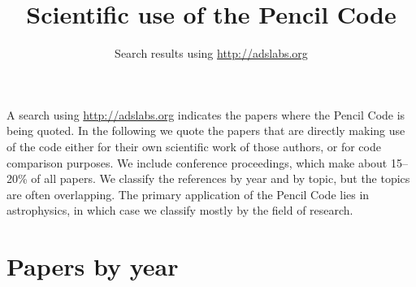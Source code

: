 \documentclass[12pt]{article}
\begin{document}
\title{Scientific use of the {\sc Pencil Code}}
\author{Search results using \url{http://adslabs.org}}
\maketitle

A search using \url{http://adslabs.org} indicates the papers where the
{\sc Pencil Code} is being quoted.
In the following we quote the papers that are directly making use of
the code either for their own scientific work of those authors, or
for code comparison purposes.
We include conference proceedings, which make about 15--20\% of all papers.
We classify the references by year and by topic, but the topics are
often overlapping.
The primary application of the {\sc Pencil Code} lies in astrophysics,
in which case we classify mostly by the field of research.

\section{Papers by year}
\end{document}
